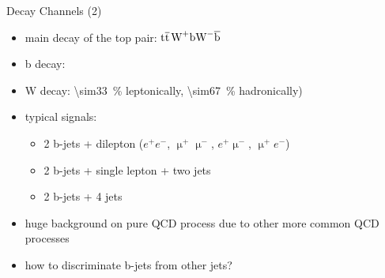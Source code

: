 \begin{frame}{Decay Channels (2)}

	\begin{itemize}\itemfill 
		\item main decay of the top pair: $\text{t}\overline{\text{t}}$\ch{->}$\text{W}^+\text{b}\text{W}^-\overline{\text{b}}$
		\item b decay:
	\end{itemize}
	
	\begin{figure}\vspace*{-10pt}
		\centering
		\hspace*{10pt}
	\end{figure}
	
	\begin{itemize}\itemfill
		\item W decay: \SI{\sim33}{\%} leptonically, \SI{\sim67}{\%} hadronically)
		\item typical signals:
		\begin{itemize}
			\item 2 b-jets + dilepton ($e^+e^-$, $\upmu^+\upmu^-$, $e^+\upmu^-$, $\upmu^+e^-$)
			\item 2 b-jets + single lepton + two jets
			\item 2 b-jets + 4 jets
		\end{itemize}
		\item huge background on pure QCD process due to other more common QCD processes
		\item how to discriminate b-jets from other jets?
	\end{itemize}

\end{frame}
